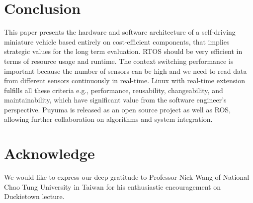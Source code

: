 \documentclass[conference]{IEEEtran}
\begin{document}
\section{Conclusion}

This paper presents the hardware and software architecture of a self-driving miniature vehicle based entirely on cost-efficient components, that implies strategic values for the long term evaluation. RTOS should be very efficient in terms of resource usage and runtime. The context switching performance is important because the number of sensors can be high and we need to read data from different sensors continuously in real-time. Linux with real-time extension  fulfills all these criteria e.g., performance, reusability, changeability, and maintainability, which have significant value from the software engineer's perspective. Puyuma is released as an open source project as well as ROS, allowing further collaboration on algorithms and system integration.

\section{Acknowledge}

We would like to express our deep gratitude to Professor Nick Wang of National Chao Tung University in Taiwan for his enthusiastic encouragement on Duckietown lecture.



\end{document}
